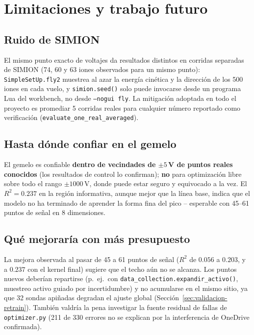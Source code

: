 \documentclass[11pt]{article}
\begin{document}
\section{Limitaciones y trabajo futuro}
\label{sec:limitaciones}

\subsection{Ruido de SIMION}

El mismo punto exacto de voltajes da resultados distintos en corridas
separadas de SIMION (74, 60 y 63 iones observados para un mismo punto):
\texttt{SimpleSetUp.fly2} muestrea al azar la energía cinética y la dirección
de los 500 iones en cada vuelo, y \texttt{simion.seed()} solo puede invocarse
desde un programa Lua del workbench, no desde \texttt{--nogui fly}. La
mitigación adoptada en todo el proyecto es promediar 5 corridas reales para
cualquier número reportado como verificación
(\texttt{evaluate\_one\_real\_averaged}).

\subsection{Hasta dónde confiar en el gemelo}

El gemelo es confiable \textbf{dentro de vecindades de $\pm5\,$V de puntos
reales conocidos} (los resultados de control lo confirman); \textbf{no} para
optimización libre sobre todo el rango $\pm1000\,$V, donde puede estar
seguro y equivocado a la vez. El $R^2=0.237$ en la región informativa, aunque
mejor que la línea base, indica que el modelo no ha terminado de aprender la
forma fina del pico -- esperable con 45--61 puntos de señal en 8 dimensiones.

\subsection{Qué mejoraría con más presupuesto}

La mejora observada al pasar de 45 a 61 puntos de señal ($R^2$ de $0.056$ a
$0.203$, y a $0.237$ con el kernel final) sugiere que el techo aún no se
alcanza. Los puntos nuevos deberían repartirse (p.\ ej.\ con
\texttt{data\_collection.expandir\_activo()}, muestreo activo guiado por
incertidumbre) y no acumularse en el mismo sitio, ya que 32 sondas apiñadas
degradan el ajuste global (Sección~\ref{sec:validacion-retrain}). También
valdría la pena investigar la fuente residual de fallas de
\texttt{optimizer.py} (211 de 330 errores no se explican por la interferencia
de OneDrive confirmada).
\end{document}
